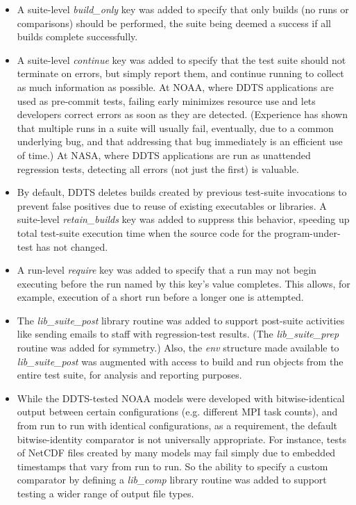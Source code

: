 \documentclass[conference]{IEEEtran}
\begin{document}
\begin{itemize}
\item A suite-level \emph{build\_only} key was added to specify that only builds (no runs or comparisons) should be performed, the suite being deemed a success if all builds complete successfully.
\item A suite-level \emph{continue} key was added to specify that the test suite should not terminate on errors, but simply report them, and continue running to collect as much information as possible. At NOAA, where DDTS applications are used as pre-commit tests, failing early minimizes resource use and lets developers correct errors as soon as they are detected. (Experience has shown that multiple runs in a suite will usually fail, eventually, due to a common underlying bug, and that addressing that bug immediately is an efficient use of time.) At NASA, where DDTS applications are run as unattended regression tests, detecting all errors (not just the first) is valuable.
\item By default, DDTS deletes builds created by previous test-suite invocations to prevent false positives due to reuse of existing executables or libraries. A suite-level \emph{retain\_builds} key was added to suppress this behavior, speeding up total test-suite execution time when the source code for the program-under-test has not changed.
\item A run-level \emph{require} key was added to specify that a run may not begin executing before the run named by this key's value completes. This allows, for example, execution of a short run before a longer one is attempted.
\item The \emph{lib\_suite\_post} library routine was added to support post-suite activities like sending emails to staff with regression-test results. (The \emph{lib\_suite\_prep} routine was added for symmetry.) Also, the \emph{env} structure made available to \emph{lib\_suite\_post} was augmented with access to build and run objects from the entire test suite, for analysis and reporting purposes.
\item While the DDTS-tested NOAA models were developed with bitwise-identical output between certain configurations (e.g. different MPI task counts), and from run to run with identical configurations, as a requirement, the default bitwise-identity comparator is not universally appropriate. For instance, tests of NetCDF files created by many models may fail simply due to embedded timestamps that vary from run to run. So the ability to specify a custom comparator by defining a \emph{lib\_comp} library routine was added to support testing a wider range of output file types.

\end{itemize}
\end{document}
